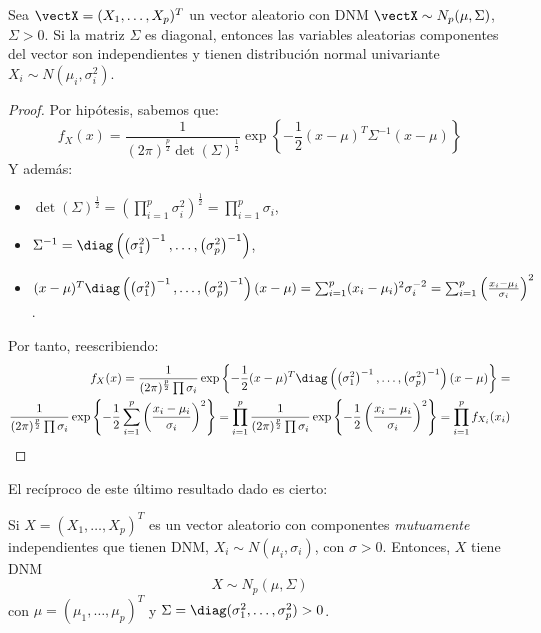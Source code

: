   \begin{nprop}
    Sea $\vectX = (X_1,\dots,X_p)^T$ un vector aleatorio con DNM $\vectX \sim N_p(\mu,\Sigma)$, $\Sigma > 0$. Si la matriz $\Sigma$ es diagonal,
    entonces las variables aleatorias componentes del vector son independientes y tienen distribución normal univariante $X_i \sim N\left(\mu_i, \sigma_i^2\right)$.
  \end{nprop}
  \begin{proof}
    Por hipótesis, sabemos que:
    \[
    f_X(x) = \frac{1}{(2\pi)^{\frac{p}{2}} \det(\Sigma)^{\frac{1}{2}}}\exp\left\{- \frac{1}{2}(x-\mu)^T \Sigma^{-1}(x-\mu)\right\}
    \]
    Y además:
    \begin{itemize}
    \item $\det(\Sigma)^{\frac{1}{2}} = \left(\prod_{i = 1}^p \sigma_i^2\right)^{\frac{1}{2}} = \prod_{i=1}^p \sigma_i$,
    \item $\Sigma^{-1} = \diag\left(\left(\sigma_1^2\right)^{-1}, \dots , \left(\sigma_p^2\right)^{-1}\right)$,
      \item $(x-\mu)^T \diag\left(\left(\sigma_1^2\right)^{-1}, \dots , \left(\sigma_p^2\right)^{-1}\right) (x-\mu) = \sum_{i=1}^p (x_i-\mu_i)^2 \sigma_i^{-2} = \sum_{i = 1}^p \left(\frac{x_i-\mu_i}{\sigma_i}\right)^2$.
    \end{itemize}
    Por tanto, reescribiendo:
    \[
      \begin{split}
        f_X(x) = \frac{1}{(2\pi)^{\frac{p}{2}} \prod \sigma_i} \exp \left\{ -\frac{1}{2}(x-\mu)^T \diag\left(\left(\sigma_1^2\right)^{-1}, \dots , \left(\sigma_p^2\right)^{-1}\right) (x-\mu)  \right\} =\\
        \frac{1}{(2\pi)^{\frac{p}{2}} \prod \sigma_i} \exp \left\{ -\frac{1}{2} \sum_{i = 1}^p \left(\frac{x_i-\mu_i}{\sigma_i}\right)^2  \right\} = \prod_{i = 1}^p  \frac{1}{(2\pi)^{\frac{p}{2}} \prod \sigma_i} \exp \left\{ -\frac{1}{2} \left(\frac{x_i-\mu_i}{\sigma_i}\right)^2  \right\} = \prod_{i = 1}^p f_{X_i}(x_i)
    \end{split}
    \]

  \end{proof}


  El recíproco de este último resultado dado es cierto:
  \begin{nprop}
    Si $X = (X_1,\dots,X_p)^T$ es un vector aleatorio con componentes \emph{mutuamente} independientes que tienen DNM, $X_i \sim N(\mu_i, \sigma_i)$, con $\sigma > 0$. Entonces, $X$ tiene DNM
    \[
    X \sim N_p(\mu, \Sigma)
    \]
    con $\mu = (\mu_1,\dots,\mu_p)^T$ y $\Sigma = \diag(\sigma_1^2 , \dots , \sigma_p^2) > 0$.
  \end{nprop}

